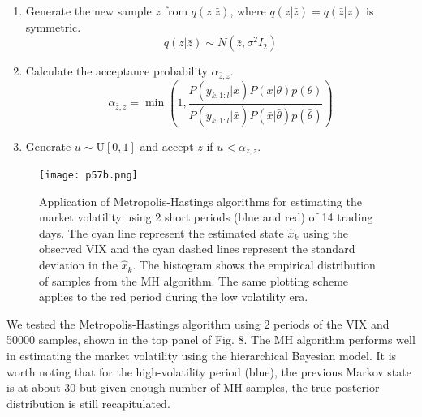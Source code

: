 \documentclass[a4paper, 11pt]{article}
\begin{document}
\begin{enumerate}
\item Generate the new sample $z$ from $q(z|\bar{z})$, where $q(z|\bar{z}) = q(\bar{z}|z)$ is symmetric.
\begin{equation}
q(z|\bar{z}) \sim N(\bar{z}, \sigma^2I_2)
\end{equation}

\item Calculate the acceptance probability $\alpha_{\bar{z}, z}$.
\begin{equation}
\alpha_{\bar{z}, z} = \min\left(1, \frac{P(y_{k,1:l}|x)P(x|\theta)p(\theta)}{P(y_{k,1:l}|\bar{x})P(\bar{x}|\bar{\theta})p(\bar{\theta})} \right)
\end{equation}

\item Generate $u\sim \text{U}[0,1]$ and accept $z$ if $u < \alpha_{\bar{z}, z}$.
\end{enumerate} 

\begin{figure}
	\begin{center}
		\texttt{[image: p57b.png]}
		\caption{Application of Metropolis-Hastings algorithms for estimating the market volatility using 2 short periods (blue and red) of 14 trading days. The cyan line represent the estimated state $\hat{x}_k$ using the observed VIX and the cyan dashed lines represent the standard deviation in the $\hat{x}_k$. The histogram shows the empirical distribution of samples from the MH algorithm. The same plotting scheme applies to the red period during the low volatility era. } 
	\end{center}
\end{figure}

We tested the Metropolis-Hastings algorithm using 2 periods of the VIX and 50000 samples, shown in the top panel of Fig. 8. The MH algorithm performs well in estimating the market volatility using the hierarchical Bayesian model. It is worth noting that for the high-volatility period (blue), the previous Markov state is at about 30 but given enough number of MH samples, the true posterior distribution is still recapitulated. 


\end{document}
